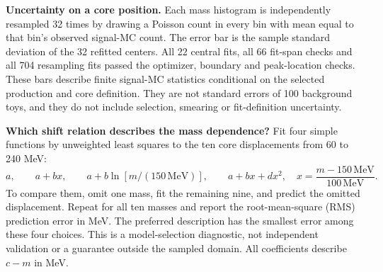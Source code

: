 \documentclass[11pt]{article}
\begin{document}
\textbf{Uncertainty on a core position.} Each mass histogram is independently resampled 32 times by drawing a Poisson count in every bin with mean equal to that bin's observed signal-MC count. The error bar is the sample standard deviation of the 32 refitted centers. All 22 central fits, all 66 fit-span checks and all 704 resampling fits passed the optimizer, boundary and peak-location checks. These bars describe finite signal-MC statistics conditional on the selected production and core definition. They are not standard errors of 100 background toys, and they do not include selection, smearing or fit-definition uncertainty.

\textbf{Which shift relation describes the mass dependence?} Fit four simple functions by unweighted least squares to the ten core displacements from 60 to 240 MeV:
\[
 a,\qquad a+bx,\qquad a+b\ln[m/(150\,\mathrm{MeV})],\qquad a+bx+dx^2,
 \quad x=\frac{m-150\,\mathrm{MeV}}{100\,\mathrm{MeV}}.
\]
To compare them, omit one mass, fit the remaining nine, and predict the omitted displacement. Repeat for all ten masses and report the root-mean-square (RMS) prediction error in MeV. The preferred description has the smallest error among these four choices. This is a model-selection diagnostic, not independent validation or a guarantee outside the sampled domain. All coefficients describe $c-m$ in MeV.
\end{document}
